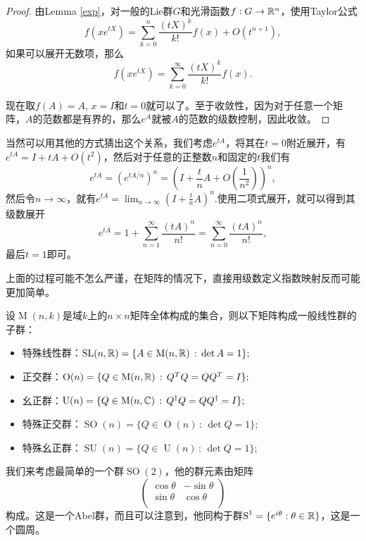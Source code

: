 \begin{proof}
由Lemma \ref{exp}，对一般的Lie群$G$和光滑函数$f:G\to \mathbb{R}^n$，使用Taylor公式
\[
	f(xe^{tX})=\sum_{k=0}^n\frac{(tX)^{k}}{k!}f(x)+O(t^{n+1}),
\]
如果可以展开无数项，那么
\[
	f(xe^{tX})=\sum_{k=0}^\infty\frac{(tX)^{k}}{k!}f(x).
\]

现在取$f(A)=A$, $x=I$和$t=0$就可以了。至于收敛性，因为对于任意一个矩阵，$A$的范数都是有界的，那么$e^A$就被$A$的范数的级数控制，因此收敛。
\end{proof}

当然可以用其他的方式猜出这个关系，我们考虑$e^{tA}$，将其在$t=0$附近展开，有$e^{tA}=I+tA+O(t^2)$，然后对于任意的正整数$n$和固定的$t$我们有
\[
	e^{tA}=\left(e^{tA/n}\right)^n=\left(I+\frac{t}{n}A+O\left(\frac{1}{n^2}\right)\right)^n,
\]
然后令$n\to\infty$，就有$e^{tA}=\lim_{n\to\infty}\left(I+\frac{t}{n}A\right)^n$.使用二项式展开，就可以得到其级数展开
\[
	e^{tA}=1+\sum_{n=1}^\infty \frac{(tA)^n}{n!}=\sum_{n=0}^\infty \frac{(tA)^n}{n!},
\]
最后$t=1$即可。

上面的过程可能不怎么严谨，在矩阵的情况下，直接用级数定义指数映射反而可能更加简单。

\para 设$\operatorname{M}(n,k)$是域$k$上的$n\times n$矩阵全体构成的集合，则以下矩阵构成一般线性群的子群：

\begin{itemize}
\item 特殊线性群：$\operatorname{SL}(n,\mathbb{R})=\{A\in \operatorname{M}(n,\mathbb{R})\,:\,\det A=1\};$
\item 正交群：$\operatorname{O}(n) = \{ Q \in \operatorname{M}(n,\mathbb{R}) \,:\, Q^T Q = Q Q^T = I \};$
\item 幺正群：$\operatorname{U}(n) = \{ Q \in \operatorname{M}(n,\mathbb{C}) \,:\, Q^\dag Q = Q Q^\dag = I \};$
\item 特殊正交群：$\operatorname{SO}(n) =\{ Q \in \operatorname{O}(n) \,:\, \det Q=1 \};$
\item 特殊幺正群：$\operatorname{SU}(n) =\{ Q \in \operatorname{U}(n) \,:\, \det Q=1 \};$
\end{itemize}

我们来考虑最简单的一个群$\operatorname{SO}(2)$，他的群元素由矩阵
\[
	\begin{pmatrix}
	\cos \theta&-\sin \theta\\
	\sin \theta&\cos \theta\\
	\end{pmatrix}
\]
构成。这是一个Abel群，而且可以注意到，他同构于群$\operatorname{S}^1=\{e^{i\theta}:\theta\in\mathbb{R}\}$，这是一个圆周。

